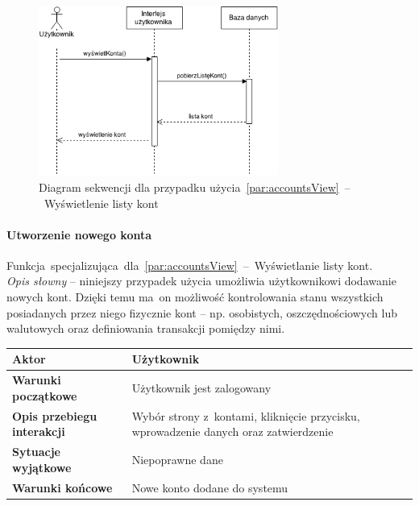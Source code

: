 \begin{figure}[H]
  \centering
  \includegraphics[width=0.7\textwidth]{images/sequence-diagram-accounts-view.png}
  \caption{Diagram sekwencji dla przypadku użycia~\ref{par:accountsView}~--~Wyświetlenie listy kont}
\end{figure}

\paragraph{Utworzenie nowego konta\newline}
\label{par:accountCreate}
Funkcja~specjalizująca~dla~\ref{par:accountsView}~--~Wyświetlanie listy kont.\\

\textit{Opis słowny} -- niniejszy przypadek użycia umożliwia użytkownikowi dodawanie nowych kont. Dzięki temu ma~on możliwość kontrolowania stanu wszystkich posiadanych przez niego fizycznie kont -- np. osobistych, oszczędnościowych lub walutowych oraz definiowania transakcji pomiędzy nimi.\\

\begin{tabular}{|l|p{9cm}|}
  \hline \textbf{Aktor} & Użytkownik \\ \hline
  \textbf{Warunki początkowe} & Użytkownik jest zalogowany \\ \hline
  \textbf{Opis przebiegu interakcji} & Wybór strony z~kontami, kliknięcie przycisku, wprowadzenie danych oraz zatwierdzenie \\ \hline
  \textbf{Sytuacje wyjątkowe} & Niepoprawne dane \\ \hline
  \textbf{Warunki końcowe} & Nowe konto dodane do systemu \\ \hline
\end{tabular}\\\\


